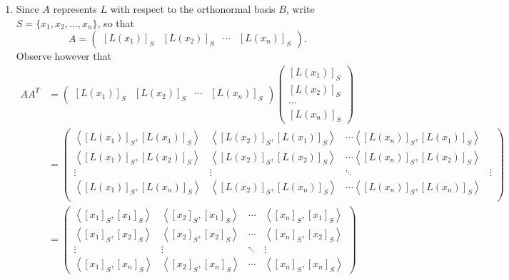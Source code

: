 \documentclass[12pt,letterpaper,boxed]{math_hw_pset}
\newcommand{\<}{\left<}
\renewcommand{\>}{\right>}
\begin{document}
\begin{solution}
\begin{enumerate}
        \item Since $A$ represents $L$ with respect to the orthonormal basis $B$, 
        write $S =  \{x_1, x_2, \dots, x_n\}$, so that
        \[
            A = 
            \begin{pmatrix}
                [L(x_1)]_S & [L(x_2)]_S & \cdots & [L(x_n)]_S 
            \end{pmatrix}.
        \]
        Observe however that 
        \begin{align*}
            AA^{T} &= \begin{pmatrix}
                [L(x_1)]_S & [L(x_2)]_S & \cdots & [L(x_n)]_S 
            \end{pmatrix}
            \begin{pmatrix}
                [L(x_1)]_S \\ [L(x_2)]_S \\ \cdots \\ [L(x_n)]_S 
            \end{pmatrix}\\
            &=
            \begin{pmatrix}
                \left<[L(x_1)]_S, [L(x_1)]_S \right> & \left<[L(x_2)]_S, [L(x_1)]_S \right>
                & \cdots \left< [L(x_n)]_S, [L(x_1)]_S \right>\\
                \left<[L(x_1)]_S, [L(x_2)]_S \right> & \left<[L(x_2)]_S, [L(x_2)]_S \right>
                & \cdots \left< [L(x_n)]_S, [L(x_2)]_S \right>\\
                \vdots & \vdots & \ddots & \vdots\\
                \left<[L(x_1)]_S, [L(x_n)]_S \right> & \left<[L(x_2)]_S, [L(x_n)]_S \right>
                & \cdots \left< [L(x_n)]_S, [L(x_n)]_S \right>\\
            \end{pmatrix}\\
            &= 
            \begin{pmatrix}
                \left<[x_1]_S, [x_1]_S  \right> & \left<[x_2]_S, [x_1]_S  \right> & \cdots & \left<[x_n]_S, [x_1]_S  \right>\\
                \left<[x_1]_S, [x_2]_S  \right> & \left<[x_2]_S, [x_2]_S  \right> & \cdots & \left<[x_n]_S, [x_2]_S  \right>\\
                \vdots & \vdots & \ddots & \vdots\\
                \left<[x_1]_S, [x_n]_S  \right> & \left<[x_2]_S, [x_n]_S  \right> & \cdots & \left<[x_n]_S, [x_n]_S  \right>
            \end{pmatrix}\\

\end{align*}
\end{enumerate}
\end{solution}
\end{document}
